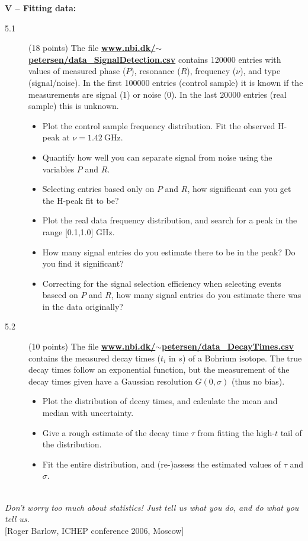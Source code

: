 \documentclass[11pt]{article}
\begin{document}
\noindent
{\bf V -- Fitting data:}
\vspace*{-1ex}
\begin{description}
\item[5.1] (18 points)
  The file \href{http://www.nbi.dk/~petersen/data\_SignalDetection.csv}{\bf www.nbi.dk/$\sim$petersen/data\_SignalDetection.csv}
  contains 120000 entries with values of measured phase ($P$), resonance ($R$), frequency ($\nu$), and type (signal/noise).
  In the first 100000 entries (control sample) it is known if the measurements are signal (1) or noise (0).
  In the last 20000 entries (real sample) this is unknown.
  \vspace*{-1ex}
  \begin{itemize}
    \item Plot the control sample frequency distribution. Fit the observed H-peak at $\nu = 1.42~\mbox{GHz}$.
    \item Quantify how well you can separate signal from noise using the variables $P$ and $R$.
    \item Selecting entries based only on $P$ and $R$, how significant can you get the H-peak fit to be?
    \item Plot the real data frequency distribution, and search for a peak in the range [0.1,1.0] GHz.
    \item How many signal entries do you estimate there to be in the peak? Do you find it significant?
    \item Correcting for the signal selection efficiency when selecting events baseed on $P$ and $R$,
      how many signal entries do you estimate there was in the data originally?
  \end{itemize}
%
\item[5.2] (10 points)
  The file
  \href{http://www.nbi.dk/~petersen/data\_DecayTimes.csv}{\bf www.nbi.dk/$\sim$petersen/data\_DecayTimes.csv}
  contains the measured decay times ($t_i$ in $s$) of a Bohrium isotope. The true decay times follow an exponential function,
  but the measurement of the decay times given have a Gaussian resolution $G(0,\sigma)$ (thus no bias).
  \vspace*{-4ex}
  \begin{itemize}
    \item Plot the distribution of decay times, and calculate the mean and median with uncertainty.
    \item Give a rough estimate of the decay time $\tau$ from fitting the high-$t$ tail of the distribution.
    \item Fit the entire distribution, and (re-)assess the estimated values of $\tau$ and $\sigma$.
  \end{itemize}
\end{description}

\vspace*{-2ex}
\noindent
\hrulefill\\
\emph{Don't worry too much about statistics! Just tell us what you do, and do what you tell us.}\\
  \phantom{foobar} \hfill [Roger Barlow, ICHEP conference 2006, Moscow]\\[-2ex]


\end{document}
